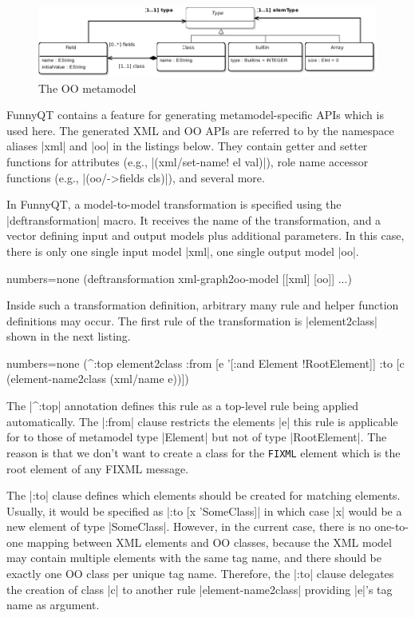 \documentclass[submission]{eptcs}
\newcommand{\code}{\clojureinline}
\begin{document}
\begin{figure}[h!t]
  \centering
  \includegraphics[width=\textwidth]{../postproc/oo-mm}
  \caption{The OO metamodel}
  \label{fig:oo-mm}
\end{figure}

FunnyQT contains a feature for generating metamodel-specific APIs which is used
here.  The generated XML and OO APIs are referred to by the namespace aliases
\code|xml| and \code|oo| in the listings below.  They contain getter and setter
functions for attributes (e.g., \code|(xml/set-name! el val)|), role name
accessor functions (e.g., \code|(oo/->fields cls)|), and several more.

In FunnyQT, a model-to-model transformation is specified using the
\code|deftransformation| macro.  It receives the name of the transformation,
and a vector defining input and output models plus additional parameters.  In
this case, there is only one single input model \code|xml|, one single output
model \code|oo|.

\begin{clojurecode*}{numbers=none}
(deftransformation xml-graph2oo-model [[xml] [oo]]
  ...)
\end{clojurecode*}

Inside such a transformation definition, arbitrary many rule and helper
function definitions may occur.  The first rule of the transformation is
\code|element2class| shown in the next listing.

\begin{clojurecode*}{numbers=none}
  (^:top element2class
   :from [e '[:and Element !RootElement]]
   :to   [c (element-name2class (xml/name e))])
\end{clojurecode*}

The \code|^:top| annotation defines this rule as a top-level rule being applied
automatically.  The \code|:from| clause restricts the elements \code|e| this
rule is applicable for to those of metamodel type \code|Element| but not of
type \code|RootElement|.  The reason is that we don't want to create a class
for the \texttt{FIXML} element which is the root element of any FIXML message.

The \code|:to| clause defines which elements should be created for matching
elements.  Usually, it would be specified as \code|:to [x 'SomeClass]| in which
case \code|x| would be a new element of type \code|SomeClass|.  However, in the
current case, there is no one-to-one mapping between XML elements and OO
classes, because the XML model may contain multiple elements with the same tag
name, and there should be exactly one OO class per unique tag name.  Therefore,
the \code|:to| clause delegates the creation of class \code|c| to another rule
\code|element-name2class| providing \code|e|'s tag name as argument.
\end{document}
